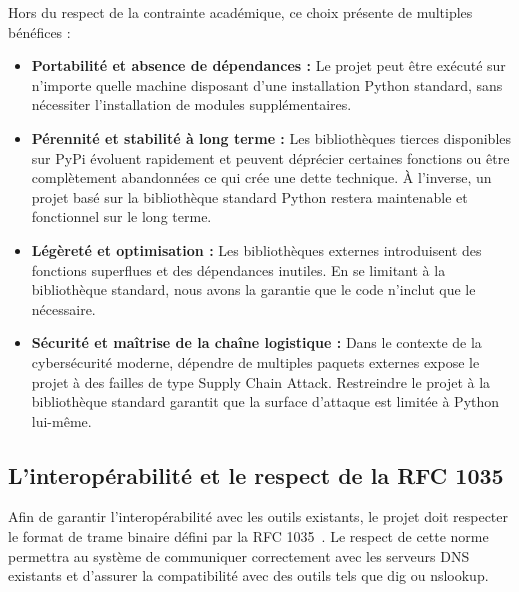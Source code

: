 Hors du respect de la contrainte académique, ce choix présente de multiples bénéfices :
\begin{itemize}
    \item \textbf{Portabilité et absence de dépendances :}
    Le projet peut être exécuté sur n'importe quelle machine disposant d'une installation Python standard, sans nécessiter l'installation de modules supplémentaires.
    \item \textbf{Pérennité et stabilité à long terme :}
    Les bibliothèques tierces disponibles sur PyPi évoluent rapidement et peuvent déprécier certaines fonctions ou être complètement abandonnées ce qui crée une dette technique.
    À l'inverse, un projet basé sur la bibliothèque standard Python restera maintenable et fonctionnel sur le long terme.
    \item \textbf{Légèreté et optimisation :}
    Les bibliothèques externes introduisent des fonctions superflues et des dépendances inutiles.
    En se limitant à la bibliothèque standard, nous avons la garantie que le code n'inclut que le nécessaire.
    \item \textbf{Sécurité et maîtrise de la chaîne logistique :}
    Dans le contexte de la cybersécurité moderne, dépendre de multiples paquets externes expose le projet à des failles de type Supply Chain Attack.
    Restreindre le projet à la bibliothèque standard garantit que la surface d'attaque est limitée à Python lui-même.
\end{itemize}

\subsection{L'interopérabilité et le respect de la RFC 1035}
Afin de garantir l'interopérabilité avec les outils existants, le projet doit respecter le format de trame binaire défini par la RFC 1035~\cite{rfc1035}.
Le respect de cette norme permettra au système de communiquer correctement avec les serveurs DNS existants et d'assurer la compatibilité avec des outils tels que dig ou nslookup.
